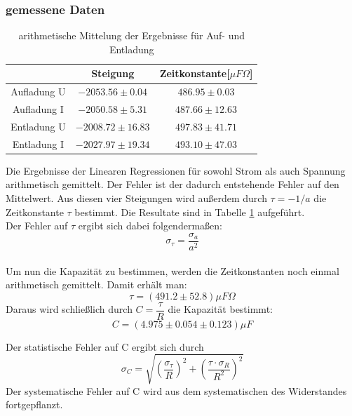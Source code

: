\documentclass[12pt,a4paper]{article}
\begin{document}
\subsubsection{gemessene Daten}
\begin{table}[H]
\begin{center}
\begin{tabular}{|c|c|c|}
\hline 
 & Steigung & Zeitkonstante[$ \mu F\Omega$] \\ 
\hline 
Aufladung U & $-2053.56\pm 0.04$ & $486.95\pm 0.03$ \\ 
\hline 
Aufladung I  & $-2050.58\pm 5.31$ & $487.66\pm 12.63$\\ 
\hline 
Entladung U & $-2008.72\pm 16.83$ & $497.83\pm 41.71$ \\ 
\hline 
Entladung I  & $-2027.97\pm 19.34$ & $493.10\pm 47.03$ \\ 
\hline 
\end{tabular} 
\end{center}
\caption{arithmetische Mittelung der Ergebnisse für Auf- und Entladung}
\label{tab:kond_linreg} 
\end{table}
Die Ergebnisse der Linearen Regressionen für sowohl Strom als auch Spannung arithmetisch gemittelt. Der Fehler ist der dadurch entstehende Fehler auf den Mittelwert.
Aus diesen vier Steigungen wird außerdem durch $\tau = -1/a$ die Zeitkonstante $\tau$ bestimmt. Die Resultate sind in Tabelle \ref{tab:kond_linreg} aufgeführt.\\
Der Fehler auf $\tau$ ergibt sich dabei folgendermaßen:
\begin{equation}
\sigma_{\tau}=\dfrac{\sigma_{a}}{a^{2}}
\end{equation}\\
Um nun die Kapazität zu bestimmen, werden die Zeitkonstanten noch einmal arithmetisch gemittelt. Damit erhält man:
\begin{equation}
\tau = (491.2\pm 52.8) \mu F\Omega
\end{equation}
Daraus wird schließlich durch $C=\dfrac{\tau}{R}$ die Kapazität bestimmt:
\begin{equation}
C = (4.975\pm 0.054\pm0.123)\mu F
\end{equation}

Der statistische Fehler auf C ergibt sich durch
\begin{equation}
\sigma_C = \sqrt{(\dfrac{\sigma_{\tau}}{R})^{2}+(\dfrac{\tau \cdot \sigma_{R}}{R^{2}})^{2}}
\end{equation}
Der systematische Fehler auf C wird aus dem systematischen des Widerstandes fortgepflanzt.
\newpage
\end{document}
